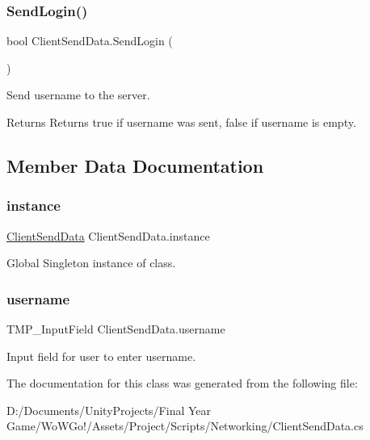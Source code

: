 \subsubsection{\texorpdfstring{SendLogin()}{SendLogin()}}
{\footnotesize\ttfamily bool Client\+Send\+Data.\+Send\+Login (\begin{DoxyParamCaption}{ }\end{DoxyParamCaption})}



Send username to the server. 

\begin{DoxyReturn}{Returns}
Returns true if username was sent, false if username is empty.
\end{DoxyReturn}


\subsection{Member Data Documentation}
\mbox{\label{class_client_send_data_acdad1498e2dc672310edae72ad9a655e}} 
\subsubsection{\texorpdfstring{instance}{instance}}
{\footnotesize\ttfamily \mbox{\hyperlink{class_client_send_data}{Client\+Send\+Data}} Client\+Send\+Data.\+instance\hspace{0.3cm}{\ttfamily [static]}}



Global Singleton instance of class. 

\mbox{\label{class_client_send_data_a849beae9051bf483a4dd446b74d50812}} 
\subsubsection{\texorpdfstring{username}{username}}
{\footnotesize\ttfamily T\+M\+P\+\_\+\+Input\+Field Client\+Send\+Data.\+username}



Input field for user to enter username. 



The documentation for this class was generated from the following file\+:\begin{DoxyCompactItemize}
\item 
D\+:/\+Documents/\+Unity\+Projects/\+Final Year Game/\+Wo\+W\+Go!/\+Assets/\+Project/\+Scripts/\+Networking/Client\+Send\+Data.\+cs\end{DoxyCompactItemize}
